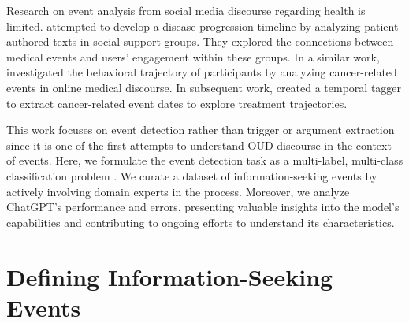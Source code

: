 \documentclass[letterpaper]{article} %
\begin{document}
Research on event analysis from social media discourse regarding health is limited. \citeauthor{naik-etal-2017-extracting}  attempted to develop a disease progression timeline by analyzing patient-authored texts in social support groups. They explored the connections between medical events and users' engagement within these groups. In a similar work, \citeauthor{wen_12}  investigated the behavioral trajectory of participants by analyzing cancer-related events in online medical discourse. In subsequent work, \citeauthor{wen-etal-2013-extracting}  created a temporal tagger to extract cancer-related event dates to explore treatment trajectories. 

This work focuses on event detection rather than trigger or argument extraction since it is one of the first attempts to understand OUD discourse in the context of events. Here, we formulate the event detection task as a multi-label, multi-class classification problem \cite{BOGATINOVSKI2022117215}. We curate a dataset of information-seeking events by actively involving domain experts in the process. Moreover, we analyze ChatGPT's performance and errors, presenting valuable insights into the model's capabilities and contributing to ongoing efforts to understand its characteristics.


\section{Defining Information-Seeking Events}
\end{document}
